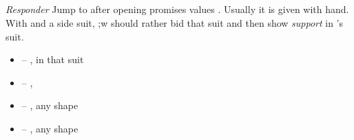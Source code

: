 \subsection{}
\label{subsec:jacoby}

\emph{Responder} Jump to \ctr{2\nt} after \ctr{1\major} opening promises \gf\/ values \ws{}. Usually it is given with
\bal\/ hand. With  and a side  suit, \resp\/;w should rather bid that suit and then show
\emph{support} in \opn's suit.

\begin{itemize}
  \item {} -- ,  in that suit
  \item {} -- , \bal
  \item \ctr{3\nt} -- , any shape
  \item {} -- , any shape
\end{itemize}
